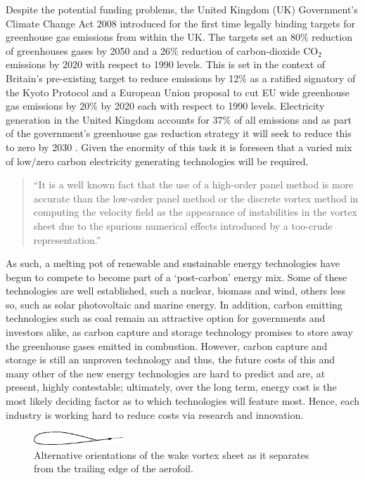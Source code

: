 Despite the potential funding problems, the United Kingdom (UK) Government's
Climate Change Act 2008 \citep*[see][2008]{CCA:2008:Defra} introduced for the
first time legally binding targets for greenhouse gas emissions from within the
UK. The targets set an 80\% reduction of greenhouses gases by 2050 and a 26\%
reduction of carbon-dioxide $\text{CO}_{2}$ emissions by 2020 with respect to
1990 levels. This is set in the context of Britain's pre-existing target to
reduce emissions by 12\% as a ratified signatory of the Kyoto Protocol
and a European Union proposal to cut EU wide greenhouse gas emissions by 20\% by
2020 each with respect to 1990 levels. Electricity generation in the United
Kingdom accounts for 37\% of all emissions and as part of the
government's greenhouse gas reduction strategy it will seek to reduce this to
zero by 2030 \citep[see][2008]{CCC:2008}. Given the enormity of this task it is
foreseen that a varied mix of low/zero carbon electricity generating
technologies will be required.
\begin{quote}
 ``It is a well known fact that the use of a high-order panel method is more
accurate than the
low-order panel method or the discrete vortex method in computing the velocity
field as the
appearance of instabilities in the vortex sheet due to the spurious numerical
effects introduced by
a too-crude representation.''
\end{quote}
As such, a melting pot of renewable and sustainable energy technologies have
begun to compete to become part of a `post-carbon' energy mix. Some of these
technologies are well established, such a nuclear, biomass and wind, others less
so, such as solar photovoltaic and marine energy. In addition, carbon emitting
technologies such as coal remain an attractive option for governments and
investors alike, as carbon capture and storage technology promises to store away
the greenhouse gases emitted in combustion. However, carbon capture and storage
is still an unproven technology and thus, the future costs of this and many
other of the new energy technologies are hard to predict and are, at present,
highly contestable; ultimately, over the long term, energy cost is the most
likely deciding factor as to which technologies will feature most. Hence, each
industry is working hard to reduce costs via research and innovation.

\begin{figure}[htb]
\centering
\includegraphics[width=0.3\textwidth]{bottomkutta}
\caption{Alternative orientations of the wake vortex sheet as it separates from
the trailing edge of the aerofoil.}
\label{fig:bottomkutta}
\end{figure}